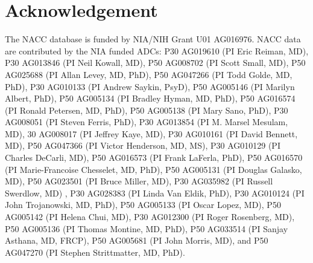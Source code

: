 \documentclass[
  nojss]{jss}
\begin{document}
\hypertarget{acknowledgement}{%
\section{Acknowledgement}\label{acknowledgement}}

The NACC database is funded by NIA/NIH Grant U01 AG016976. NACC data are
contributed by the NIA funded ADCs: P30 AG019610 (PI Eric Reiman, MD),
P30 AG013846 (PI Neil Kowall, MD), P50 AG008702 (PI Scott Small, MD),
P50 AG025688 (PI Allan Levey, MD, PhD), P50 AG047266 (PI Todd Golde, MD,
PhD), P30 AG010133 (PI Andrew Saykin, PsyD), P50 AG005146 (PI Marilyn
Albert, PhD), P50 AG005134 (PI Bradley Hyman, MD, PhD), P50 AG016574 (PI
Ronald Petersen, MD, PhD), P50 AG005138 (PI Mary Sano, PhD), P30
AG008051 (PI Steven Ferris, PhD), P30 AG013854 (PI M. Marsel Mesulam,
MD), 30 AG008017 (PI Jeffrey Kaye, MD), P30 AG010161 (PI David Bennett,
MD), P50 AG047366 (PI Victor Henderson, MD, MS), P30 AG010129 (PI
Charles DeCarli, MD), P50 AG016573 (PI Frank LaFerla, PhD), P50 AG016570
(PI Marie-Francoise Chesselet, MD, PhD), P50 AG005131 (PI Douglas
Galasko, MD), P50 AG023501 (PI Bruce Miller, MD), P30 AG035982 (PI
Russell Swerdlow, MD) , P30 AG028383 (PI Linda Van Eldik, PhD), P30
AG010124 (PI John Trojanowski, MD, PhD), P50 AG005133 (PI Oscar Lopez,
MD), P50 AG005142 (PI Helena Chui, MD), P30 AG012300 (PI Roger
Rosenberg, MD), P50 AG005136 (PI Thomas Montine, MD, PhD), P50 AG033514
(PI Sanjay Asthana, MD, FRCP), P50 AG005681 (PI John Morris, MD), and
P50 AG047270 (PI Stephen Strittmatter, MD, PhD).


\end{document}
